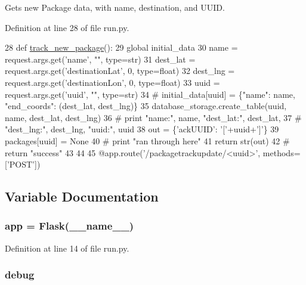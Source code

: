 Gets new Package data, with name, destination, and U\+U\+ID. 



Definition at line 28 of file run.\+py.


\begin{DoxyCode}
28 \textcolor{keyword}{def }\hyperlink{namespacerun_aa2d7bc76e937566fe3f05617c102bba9}{track\_new\_package}():
29     \textcolor{keyword}{global} initial\_data
30     name = request.args.get(\textcolor{stringliteral}{'name'}, \textcolor{stringliteral}{""}, type=str)
31     dest\_lat = request.args.get(\textcolor{stringliteral}{'destinationLat'}, 0, type=float)
32     dest\_lng = request.args.get(\textcolor{stringliteral}{'destinationLon'}, 0, type=float)
33     uuid = request.args.get(\textcolor{stringliteral}{'uuid'}, \textcolor{stringliteral}{""}, type=str)
34     \textcolor{comment}{# initial\_data[uuid] = \{"name": name, "end\_coords": (dest\_lat, dest\_lng)\}}
35     database\_storage.create\_table(uuid, name, dest\_lat, dest\_lng)
36     \textcolor{comment}{# print "name:", name, "dest\_lat:", dest\_lat,}
37     \textcolor{comment}{#                       "dest\_lng:", dest\_lng, "uuid:", uuid}
38     out = \{\textcolor{stringliteral}{'ackUUID'}: \textcolor{stringliteral}{'['}+uuid+\textcolor{stringliteral}{']'}\}
39     packages[uuid] = \textcolor{keywordtype}{None}
40     \textcolor{comment}{# print "ran through here"}
41     \textcolor{keywordflow}{return} str(out)
42     \textcolor{comment}{# return "success"}
43 
44 
45 @app.route(\textcolor{stringliteral}{'/packagetrackupdate/<uuid>'}, methods=[\textcolor{stringliteral}{'POST'}])
\end{DoxyCode}


\subsection{Variable Documentation}
\subsubsection[{\texorpdfstring{app}{app}}]{\setlength{\rightskip}{0pt plus 5cm}app = Flask(\+\_\+\+\_\+name\+\_\+\+\_\+)}\hypertarget{namespacerun_afe63fea7be31b0200b496d08bc6b517d}{}\label{namespacerun_afe63fea7be31b0200b496d08bc6b517d}


Definition at line 14 of file run.\+py.

\subsubsection[{\texorpdfstring{debug}{debug}}]{\setlength{\rightskip}{0pt plus 5cm}debug}\hypertarget{namespacerun_a0514aabed091ee5e2f35766eb01eced6}{}\label{namespacerun_a0514aabed091ee5e2f35766eb01eced6}


